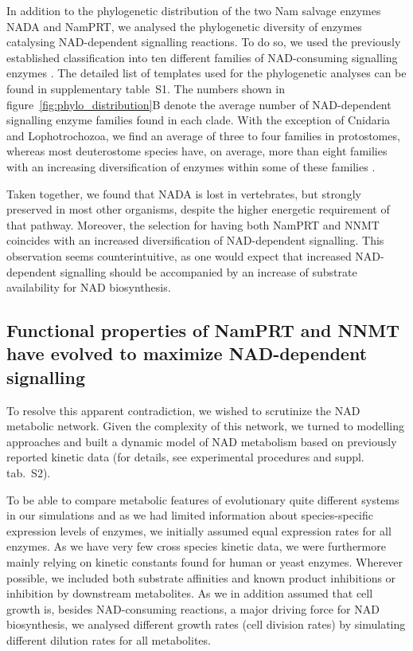 In addition to the phylogenetic distribution of the two Nam salvage enzymes NADA and NamPRT, we analysed the phylogenetic diversity of enzymes catalysing NAD-dependent signalling reactions. To do so, we used the previously established classification into ten different families of NAD-consuming signalling enzymes \citep{Gossmann2012FEBS}. The detailed list of templates used for the phylogenetic analyses can be found in supplementary table~S1. The numbers shown in figure~\ref{fig:phylo_distribution}B denote the average number of NAD-dependent signalling enzyme families found in each clade. With the exception of Cnidaria and Lophotrochozoa, we find an average of three to four families in protostomes, whereas most deuterostome species have, on average, more than eight families with an increasing diversification of enzymes within some of these families \citep{Gossmann2014DNAR}.

Taken together, we found that NADA is lost in vertebrates, but strongly preserved in most other organisms, despite the higher energetic requirement of that pathway. Moreover, the selection for having both NamPRT and NNMT coincides with an increased diversification of NAD-dependent signalling. This observation seems counterintuitive, as one would expect that increased NAD-dependent signalling should be accompanied by an increase of substrate availability for NAD biosynthesis.


\subsection{Functional properties of NamPRT and NNMT have evolved to maximize NAD-dependent signalling}

To resolve this apparent contradiction, we wished to scrutinize the NAD metabolic network. Given the complexity of this network, we turned to modelling approaches and built a dynamic model of NAD metabolism based on previously reported kinetic data (for details, see experimental procedures and suppl. tab.~S2).

To be able to compare metabolic features of evolutionary quite different systems in our simulations and as we had limited information about species-specific expression levels of enzymes, we initially assumed equal expression rates for all enzymes. As we have very few cross species kinetic data, we were furthermore mainly relying on kinetic constants found for human or yeast enzymes. Wherever possible, we included both substrate affinities and known product inhibitions or inhibition by downstream metabolites. As we in addition assumed that cell growth is, besides NAD-consuming reactions, a major driving force for NAD biosynthesis, we analysed different growth rates (cell division rates) by simulating different dilution rates for all metabolites.

